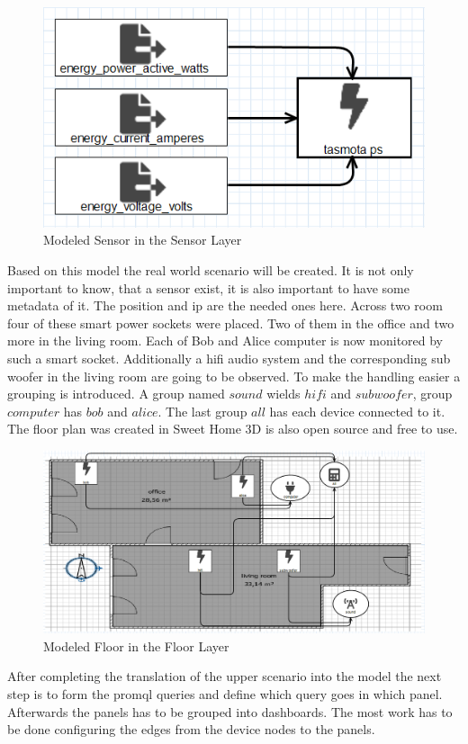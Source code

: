 \begin{figure}[H]
	\centering
	\includegraphics[width=.7\linewidth]{assets/images/sensorLayer}
	\caption{Modeled Sensor in the Sensor Layer}
\end{figure}

Based on this model the real world scenario will be created. It is not only important to know, that a sensor exist, it is also important to have some metadata of it. The position and ip are the needed ones here. Across two room four of these smart power sockets were placed. Two of them in the office and two more in the living room. Each of Bob and Alice computer is now monitored by such a smart socket. Additionally a \gls{hifi} audio system and the corresponding sub woofer in the living room are going to be observed. To make the handling easier a grouping is introduced. A group named $sound$ wields $hifi$ and $subwoofer$, group $computer$ has $bob$ and $alice$. The last group $all$ has each device connected to it. The floor plan was created in Sweet Home 3D is also open source and free to use. 

\begin{figure}[H]
	\centering
	\includegraphics[width=\linewidth]{assets/images/floorLayer}
	\caption{Modeled Floor in the Floor Layer}
\end{figure}

After completing the translation of the upper scenario into the model the next step is to form the \gls{promql} queries and define which query goes in which panel. Afterwards the panels has to be grouped into dashboards. The most work has to be done configuring the edges from the device nodes to the panels.

